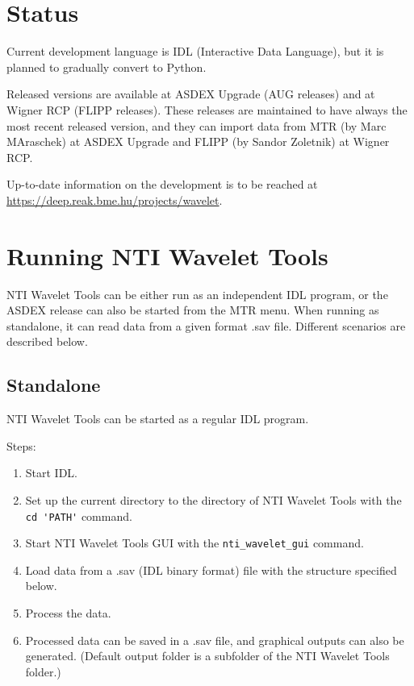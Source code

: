 \documentclass[12pt]{article}
\begin{document}
\section{Status}

Current development language is IDL (Interactive Data Language), but it is planned to gradually convert to Python.

Released versions are available at ASDEX Upgrade (AUG releases) and at Wigner RCP (FLIPP releases). These releases are maintained to have always the most recent released version, and they can import data from MTR (by Marc MAraschek) at ASDEX Upgrade and FLIPP (by Sandor Zoletnik) at Wigner RCP.

Up-to-date information on the development is to be reached at \url{https://deep.reak.bme.hu/projects/wavelet}.

\section{Running NTI Wavelet Tools}\label{sec:running}

NTI Wavelet Tools can be either run as an independent IDL program, or the ASDEX release can also be started from the MTR menu. When running as standalone, it can read data from a given format .sav file. Different scenarios are described below. 

\subsection{Standalone}

NTI Wavelet Tools can be started as a regular IDL program.

Steps:
\begin{enumerate}
	\item Start IDL.
	\item Set up the current directory to the directory of NTI Wavelet Tools with the \verb|cd 'PATH'| command.
	\item Start NTI Wavelet Tools GUI with the \verb|nti_wavelet_gui| command.
	\item Load data from a .sav (IDL binary format) file with the structure specified below. 
	\item Process the data.
	\item Processed data can be saved in a .sav file, and graphical outputs can also be generated. (Default output folder is a subfolder of the NTI Wavelet Tools folder.)
\end{enumerate}
\end{document}
